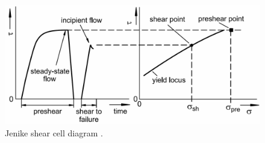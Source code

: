 \begin{figure}[!htb]
\centering
\includegraphics[width=.80\columnwidth]{images/004sjsctdiagram}
\caption[Jenike shear cell diagram]{Jenike shear cell diagram
\cite{RefWorks:69}.}
\label{fig:004sjsctdiagram}
\end{figure}